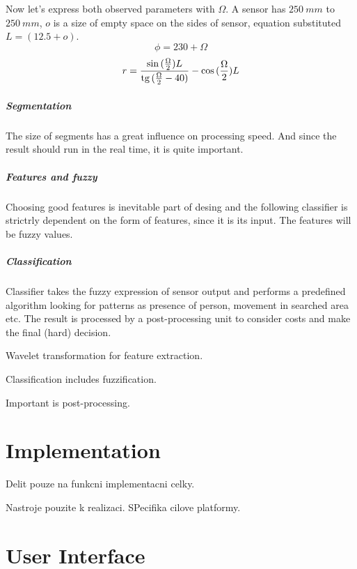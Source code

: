 Now let's express both observed parameters with $\Omega$. A sensor has $250~mm$ to $250~mm$,
$o$ is a size of empty space on the sides of sensor, equation substituted $L = (12.5 + o)$.
$$\phi = 230 + \Omega$$
$$r = \frac{\sin{(\frac{\Omega}{2})}L}{\tg{(\frac{\Omega}{2}-40)}} - \cos{(\frac{\Omega}{2})}L$$


\paragraph{Segmentation}
The size of segments has a great influence on processing speed. And since the
result should run in the real time, it is quite important.

\paragraph{Features and fuzzy}
Choosing good features is inevitable part of desing and the following classifier
is strictrly dependent on the form of features, since it is its input. The features
will be fuzzy values.

\paragraph{Classification}
Classifier takes the fuzzy expression of sensor output and performs a predefined
algorithm looking for patterns as presence of person, movement in searched area etc.
The result is processed by a post-processing unit to consider costs and make 
the final (hard) decision.





Wavelet transformation for feature extraction.

Classification includes fuzzification.

Important is post-processing.



\chapter{Implementation}

Delit pouze na funkcni implementacni celky.

Nastroje pouzite k realizaci. SPecifika cilove platformy.



\chapter{User Interface}




